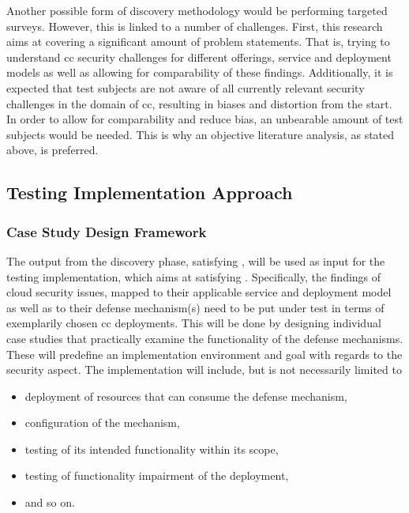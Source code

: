 {	Another possible form of discovery methodology would be performing targeted surveys. However, this is linked to a number of challenges. First, this research aims at covering a significant amount of problem statements. That is, trying to understand \ac{cc} security challenges for different offerings, service and deployment models as well as allowing for comparability of these findings. Additionally, it is expected that test subjects are not aware of all currently relevant security challenges in the domain of \ac{cc}, resulting in biases and distortion from the start. In order to allow for comparability and reduce bias, an unbearable amount of test subjects would be needed. This is why an objective literature analysis, as stated above, is preferred.

	
	\subsection{Testing Implementation Approach} \label{subsec:approach-structure-testing}
	
		\subsubsection{Case Study Design Framework}
		
		The output from the discovery phase, satisfying , will be used as input for the testing implementation, which aims at satisfying . Specifically, the findings of cloud security issues, mapped to their applicable service and deployment model as well as to their defense mechanism(s) need to be put under test in terms of exemplarily chosen \ac{cc} deployments. This will be done by designing individual case studies that practically examine the functionality of the defense mechanisms. These will predefine an implementation environment and goal with regards to the security aspect. The implementation will include, but is not necessarily limited to
		
		\begin{itemize}
			\item deployment of resources that can consume the defense mechanism,
			\item configuration of the mechanism,
			\item testing of its intended functionality within its scope,
			\item testing of functionality impairment of the deployment,
			\item and so on.
		\end{itemize}
		
}
